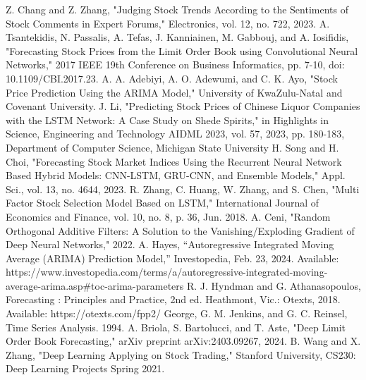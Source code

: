 \documentclass[conference]{IEEEtran}
\begin{document}
\begin{thebibliography}{00}
 Z. Chang and Z. Zhang, "Judging Stock Trends According to the Sentiments of Stock Comments in Expert Forums," Electronics, vol. 12, no. 722, 2023.
 A. Tsantekidis, N. Passalis, A. Tefas, J. Kanniainen, M. Gabbouj, and A. Iosifidis, "Forecasting Stock Prices from the Limit Order Book using Convolutional Neural Networks," 2017 IEEE 19th Conference on Business Informatics, pp. 7-10, doi: 10.1109/CBI.2017.23.
 A. A. Adebiyi, A. O. Adewumi, and C. K. Ayo, "Stock Price Prediction Using the ARIMA Model," University of KwaZulu-Natal and Covenant University.
 J. Li, "Predicting Stock Prices of Chinese Liquor Companies with the LSTM Network: A Case Study on Shede Spirits," in Highlights in Science, Engineering and Technology AIDML 2023, vol. 57, 2023, pp. 180-183, Department of Computer Science, Michigan State University
 H. Song and H. Choi, "Forecasting Stock Market Indices Using the Recurrent Neural Network Based Hybrid Models: CNN-LSTM, GRU-CNN, and Ensemble Models," Appl. Sci., vol. 13, no. 4644, 2023.
 R. Zhang, C. Huang, W. Zhang, and S. Chen, "Multi Factor Stock Selection Model Based on LSTM," International Journal of Economics and Finance, vol. 10, no. 8, p. 36, Jun. 2018.
 A. Ceni, "Random Orthogonal Additive Filters: A Solution to the Vanishing/Exploding Gradient of Deep Neural Networks," 2022.
 A. Hayes, “Autoregressive Integrated Moving Average (ARIMA) Prediction Model,” Investopedia, Feb. 23, 2024. Available: https://www.investopedia.com/terms/a/autoregressive-integrated-moving-average-arima.asp#toc-arima-parameters
 R. J. Hyndman and G. Athanasopoulos, Forecasting : Principles and Practice, 2nd ed. Heathmont, Vic.: Otexts, 2018. Available: https://otexts.com/fpp2/
 George, G. M. Jenkins, and G. C. Reinsel, Time Series Analysis. 1994.
 A. Briola, S. Bartolucci, and T. Aste, "Deep Limit Order Book Forecasting," arXiv preprint arXiv:2403.09267, 2024.
 B. Wang and X. Zhang, "Deep Learning Applying on Stock Trading," Stanford University, CS230: Deep Learning Projects Spring 2021. 
\end{thebibliography}
\end{document}
